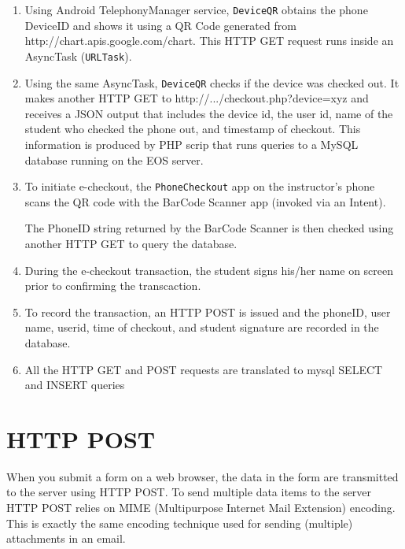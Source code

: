 \documentclass[11pt]{article} %
\begin{document}
\begin{enumerate}
\item Using Android TelephonyManager service, \texttt{DeviceQR}
obtains the phone DeviceID and shows it using a QR Code generated from
http://chart.apis.google.com/chart. This HTTP GET request runs inside
an AsyncTask (\texttt{URLTask}).


\item Using the same AsyncTask, \texttt{DeviceQR} checks if the device
was checked out. It makes another HTTP GET to
http://.../checkout.php?device=xyz and receives a JSON output that
includes the device id, the user id, name of the student who checked
the phone out, and timestamp of checkout. This information is produced
by PHP scrip that runs queries to a MySQL database running on the EOS
server.


\item To initiate e-checkout, the \texttt{PhoneCheckout} app 
on the instructor's phone scans the QR code with the BarCode Scanner
app (invoked via an Intent). 


The PhoneID string returned by the
BarCode Scanner is then checked using another HTTP GET to query the
database.


\item During the e-checkout transaction, the student signs his/her
name on screen prior to confirming the transcaction.
\item To record the transaction, an HTTP POST is issued and the
phoneID, user name, userid, time of checkout, and student signature
are recorded in the database.

\item All the HTTP GET and POST requests are translated to mysql SELECT and
   INSERT queries
\end{enumerate}

\section{HTTP POST}
When you submit a form on a web browser, the data in the form are transmitted
to the server using HTTP POST. To send multiple data items to the server
HTTP POST relies on MIME (Multipurpose Internet Mail Extension) encoding.
This is exactly the same encoding technique used for sending 
(multiple) attachments in an email.
\end{document}
